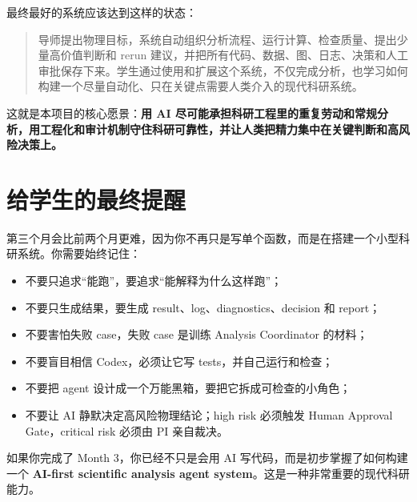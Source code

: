 \documentclass[11pt,a4paper,fontset=none]{ctexart}
\begin{document}
最终最好的系统应该达到这样的状态：

\begin{quote}
导师提出物理目标，系统自动组织分析流程、运行计算、检查质量、提出少量高价值判断和 rerun 建议，并把所有代码、数据、图、日志、决策和人工审批保存下来。学生通过使用和扩展这个系统，不仅完成分析，也学习如何构建一个尽量自动化、只在关键点需要人类介入的现代科研系统。
\end{quote}

这就是本项目的核心愿景：\textbf{用 AI 尽可能承担科研工程里的重复劳动和常规分析，用工程化和审计机制守住科研可靠性，并让人类把精力集中在关键判断和高风险决策上。}

\section{给学生的最终提醒}

第三个月会比前两个月更难，因为你不再只是写单个函数，而是在搭建一个小型科研系统。你需要始终记住：

\begin{itemize}[leftmargin=2em]
  \item 不要只追求“能跑”，要追求“能解释为什么这样跑”；
  \item 不要只生成结果，要生成 result、log、diagnostics、decision 和 report；
  \item 不要害怕失败 case，失败 case 是训练 Analysis Coordinator 的材料；
  \item 不要盲目相信 Codex，必须让它写 tests，并自己运行和检查；
  \item 不要把 agent 设计成一个万能黑箱，要把它拆成可检查的小角色；
  \item 不要让 AI 静默决定高风险物理结论；high risk 必须触发 Human Approval Gate，critical risk 必须由 PI 亲自裁决。
\end{itemize}

如果你完成了 Month 3，你已经不只是会用 AI 写代码，而是初步掌握了如何构建一个 \textbf{AI-first scientific analysis agent system}。这是一种非常重要的现代科研能力。
\end{document}
